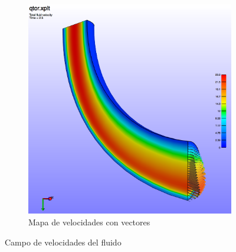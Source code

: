 \begin{figure}[!ht]
\begin{subfigure}[b]{0.48\textwidth}
\includegraphics[width=\linewidth]{figuras_4/qtor-v25a.png}
\caption{Mapa de velocidades con vectores}
\label{fig:qtor-v25a}
\end{subfigure}
\caption{Campo de velocidades del fluido}
\label{fig:qtor-v25aa}
\end{figure}

